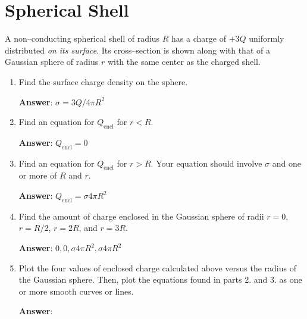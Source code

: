 \documentclass{article}
\begin{document}
\section{Spherical Shell}

A non--conducting spherical shell of radius $R$ has a charge of $+3Q$ uniformly distributed \emph{on its surface}. Its cross--section is shown along with that of a Gaussian sphere of radius $r$ with the same center as the charged shell.



\begin{enumerate}

  \item Find the surface charge density on the sphere.

        \ifsolutions
        {\bf Answer}: $\sigma = 3Q/4\pi R^2$
        \fi

        \ifsolutions\else
        \vskip 36pt
        \fi

  \item Find an equation for $Q_{\text{encl}}$ for $r<R$.

        \ifsolutions
        {\bf Answer}: $Q_{\text{encl}}=0$
        \fi

        \ifsolutions\else
        \vskip 36pt
        \fi

  \item Find an equation for $Q_{\text{encl}}$ for $r>R$. Your equation should involve $\sigma$ and one or more of $R$ and $r$.

        \ifsolutions
        {\bf Answer}: $Q_{\text{encl}}=\sigma 4\pi R^2$
        \fi

        \ifsolutions\else
        \vskip 36pt
        \fi

  \item Find the amount of charge enclosed in the Gaussian sphere of radii $r=0$, $r=R/2$, $r=2R$, and $r=3R$.

        \ifsolutions
        {\bf Answer}: $0, 0, \sigma 4 \pi R^2, \sigma 4\pi R^2$
        \fi

        \ifsolutions\else
        \vskip 36pt
        \fi

  \item Plot the four values of enclosed charge calculated above versus the radius of the Gaussian sphere. Then, plot the equations found in parts 2. and 3. as one or more smooth curves or lines.

        \ifsolutions
        {\bf Answer}: 

        
        \fi

\end{enumerate}
\end{document}

